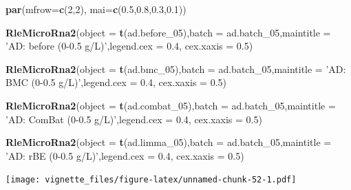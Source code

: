 \documentclass[]{book}
\newenvironment{Shaded}{\begin{snugshade}}{\end{snugshade}}
\newcommand{\KeywordTok}[1]{\textcolor[rgb]{0.13,0.29,0.53}{\textbf{#1}}}
\newcommand{\DataTypeTok}[1]{\textcolor[rgb]{0.13,0.29,0.53}{#1}}
\newcommand{\DecValTok}[1]{\textcolor[rgb]{0.00,0.00,0.81}{#1}}
\newcommand{\FloatTok}[1]{\textcolor[rgb]{0.00,0.00,0.81}{#1}}
\newcommand{\StringTok}[1]{\textcolor[rgb]{0.31,0.60,0.02}{#1}}
\newcommand{\NormalTok}[1]{#1}
\begin{document}
\begin{Shaded}
\begin{Highlighting}[]
\KeywordTok{par}\NormalTok{(}\DataTypeTok{mfrow=}\KeywordTok{c}\NormalTok{(}\DecValTok{2}\NormalTok{,}\DecValTok{2}\NormalTok{), }\DataTypeTok{mai=}\KeywordTok{c}\NormalTok{(}\FloatTok{0.5}\NormalTok{,}\FloatTok{0.8}\NormalTok{,}\FloatTok{0.3}\NormalTok{,}\FloatTok{0.1}\NormalTok{))}

\KeywordTok{RleMicroRna2}\NormalTok{(}\DataTypeTok{object =} \KeywordTok{t}\NormalTok{(ad.before_}\DecValTok{05}\NormalTok{),}\DataTypeTok{batch =}\NormalTok{ ad.batch_}\DecValTok{05}\NormalTok{,}\DataTypeTok{maintitle =} \StringTok{'AD: before (0-0.5 g/L)'}\NormalTok{,}\DataTypeTok{legend.cex =} \FloatTok{0.4}\NormalTok{, }\DataTypeTok{cex.xaxis =} \FloatTok{0.5}\NormalTok{)}

\KeywordTok{RleMicroRna2}\NormalTok{(}\DataTypeTok{object =} \KeywordTok{t}\NormalTok{(ad.bmc_}\DecValTok{05}\NormalTok{),}\DataTypeTok{batch =}\NormalTok{ ad.batch_}\DecValTok{05}\NormalTok{,}\DataTypeTok{maintitle =} \StringTok{'AD: BMC (0-0.5 g/L)'}\NormalTok{,}\DataTypeTok{legend.cex =} \FloatTok{0.4}\NormalTok{, }\DataTypeTok{cex.xaxis =} \FloatTok{0.5}\NormalTok{)}

\KeywordTok{RleMicroRna2}\NormalTok{(}\DataTypeTok{object =} \KeywordTok{t}\NormalTok{(ad.combat_}\DecValTok{05}\NormalTok{),}\DataTypeTok{batch =}\NormalTok{ ad.batch_}\DecValTok{05}\NormalTok{,}\DataTypeTok{maintitle =} \StringTok{'AD: ComBat (0-0.5 g/L)'}\NormalTok{,}\DataTypeTok{legend.cex =} \FloatTok{0.4}\NormalTok{, }\DataTypeTok{cex.xaxis =} \FloatTok{0.5}\NormalTok{)}

\KeywordTok{RleMicroRna2}\NormalTok{(}\DataTypeTok{object =} \KeywordTok{t}\NormalTok{(ad.limma_}\DecValTok{05}\NormalTok{),}\DataTypeTok{batch =}\NormalTok{ ad.batch_}\DecValTok{05}\NormalTok{,}\DataTypeTok{maintitle =} \StringTok{'AD: rBE (0-0.5 g/L)'}\NormalTok{,}\DataTypeTok{legend.cex =} \FloatTok{0.4}\NormalTok{, }\DataTypeTok{cex.xaxis =} \FloatTok{0.5}\NormalTok{)}
\end{Highlighting}
\end{Shaded}

\texttt{[image: vignette\_files/figure-latex/unnamed-chunk-52-1.pdf]}
\end{document}
